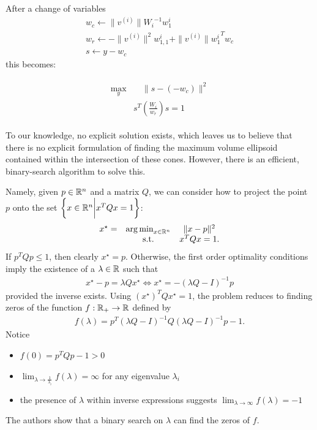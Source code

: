 After a change of variables
\begin{align*}
w_c \gets \|v^{(i)}\|{W_i}^{-1}w_1^i \\
w_r \gets  - \|v^{(i)}\|^2{w_{1,1}^i} + \|v^{(i)}\|{{w_1^i}}^Tw_c \\
s \gets y - w_c
\end{align*}
this becomes:

\begin{align}
\label{cone_feasibility_check}
\begin{array}{ccc}
\max_{y} & \quad \|s - \left(-w_c\right)\|^2  \\
 & s^T\left(\frac {W_i}{w_r}\right)s = 1
 \end{array}
\end{align}

To our knowledge, no explicit solution exists, which leaves us to believe that there is no explicit formulation of finding the maximum volume ellipsoid contained within the intersection of these cones.
However, there is an efficient, binary-search algorithm to solve this.


Namely, given 
$p \in \mathbb R^n$ and a matrix $Q$,
we can consider how to project the point $p$ onto the set $\left\{x \in \mathbb R^n \bigg | x^TQx = 1 \right\}$:
\begin{align*}
\begin{array}{ccc}
x^{\star} = &\operatorname*{arg\,min}_{x \in \mathbb R^n} & \|x - p\|^2 \\
& \textrm{s.t.} & x^TQx = 1.
\end{array}
\end{align*}
If $p^TQp \le 1$, then clearly $x^{\star} = p$.
Otherwise, the first order optimality conditions imply the existence of a $\lambda \in \mathbb R$ such that
\begin{align*}
x^{\star} - p = \lambda Qx^{\star} %
\Longleftrightarrow x^{\star} = -\left(\lambda Q - I\right)^{-1}p
\end{align*}
provided the inverse exists.
Using $\left(x^{\star}\right)^TQx^{\star} = 1$, the problem reduces to finding zeros of the function $f : \mathbb R_+ \to \mathbb R$ defined by
\begin{align*}
f(\lambda) = p^T\left(\lambda Q - I\right)^{-1}Q\left(\lambda Q - I\right)^{-1}p - 1.
\end{align*}
Notice 
\begin{itemize}
\item $f(0) = p^TQp - 1 > 0$
\item $\lim_{\lambda \to \frac 1 {\lambda_i}} f(\lambda) = \infty$ for any eigenvalue $\lambda_i$
\item the presence of $\lambda$ within inverse expressions suggests $\lim_{\lambda \to \infty}f(\lambda) = -1$
\end{itemize}
The authors show that a binary search on $\lambda$ can find the zeros of $f$.

